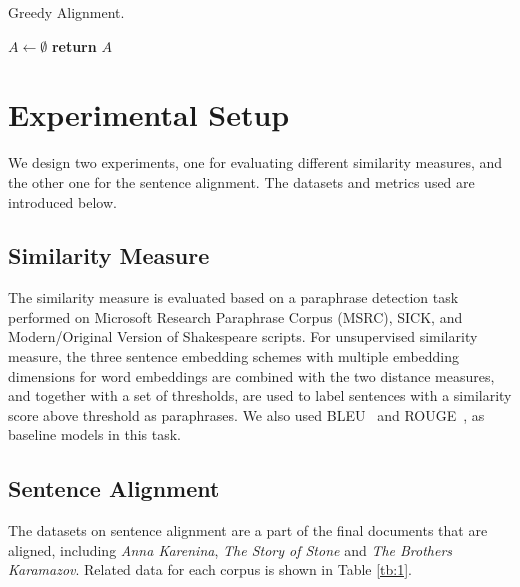 \documentclass[runningheads]{llncs}
\begin{document}
\begin{spacing}{1.1}
\begin{algorithm}
	\caption{Greedy Alignment.}
	\label{alg:1}
	$A\leftarrow \emptyset$\;
	\textbf{return} $A$\;
\end{algorithm}


\section{Experimental Setup}
\label{sec:exp}

We design two experiments, one for evaluating different similarity measures, and the other one for the sentence alignment. The datasets and metrics used are introduced below.

\subsection{Similarity Measure}

The similarity measure is evaluated based on a paraphrase detection task performed on Microsoft Research Paraphrase Corpus (MSRC), SICK, and Modern/Original Version of Shakespeare scripts. For unsupervised similarity measure, the three sentence embedding schemes with multiple embedding dimensions for word embeddings are combined with the two distance measures, and together with a set of thresholds, are used to label sentences with a similarity score above threshold as paraphrases. We also used BLEU~\cite{papineni2002bleu} and ROUGE~\cite{lin2004rouge}, as baseline models in this task.

\subsection{Sentence Alignment}

The datasets on sentence alignment are a part of the final documents that are aligned, including \emph{Anna Karenina}, \emph{The Story of Stone} and \emph{The Brothers Karamazov}. Related data for each corpus is shown in Table \ref{tb:1}.


\end{spacing}
\end{document}
